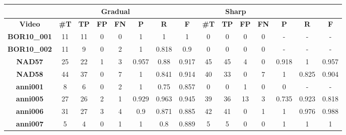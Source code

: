 \documentclass[journal]{IEEEtran}
\begin{document}
\begin{table*}[h]
\centering

\begin{tabular}{|c|c|c|c|c|c|c|c|c|c|c|c|c|c|c|}
\hline
 & \multicolumn{6}{c|}{\textbf{Gradual}} & \multicolumn{6}{c|}{\textbf{Sharp}}  \\ \hline
\textbf{Video}  & \textbf{\#T} & \textbf{TP} & \textbf{FP} & \textbf{FN} & \textbf{P} & \textbf{R} & \textbf{F} & \textbf{\#T} & \textbf{TP} & \textbf{FP} & \textbf{FN} & \textbf{P} & \textbf{R} & \textbf{F} \\ \hline
\textbf{BOR10\_001} & 11            & 11          & 0           & 0           & 1          & 1          & 1          & 0             & 0           & 0           & 0           & -          & -          & -          \\ \hline
\textbf{BOR10\_002} & 11            & 9           & 0           & 2           & 1          & 0.818      & 0.9        & 0             & 0           & 0           & 0           & -          & -          & -          \\ \hline
\textbf{NAD57}      & 25            & 22          & 1           & 3           & 0.957      & 0.88       & 0.917      & 45            & 45          & 4           & 0           & 0.918      & 1          & 0.957      \\ \hline
\textbf{NAD58}      & 44            & 37          & 0           & 7           & 1          & 0.841      & 0.914      & 40            & 33          & 0           & 7           & 1          & 0.825      & 0.904      \\ \hline
\textbf{anni001}    & 8             & 6           & 0           & 2           & 1          & 0.75       & 0.857      & 0             & 0           & 1           & 0           & 0          & -          & -          \\ \hline
\textbf{anni005}    & 27            & 26          & 2           & 1           & 0.929      & 0.963      & 0.945      & 39            & 36          & 13          & 3           & 0.735      & 0.923      & 0.818      \\ \hline
\textbf{anni006}    & 31            & 27          & 3           & 4           & 0.9        & 0.871      & 0.885      & 42            & 41          & 0           & 1           & 1          & 0.976      & 0.988      \\ \hline
\textbf{anni007}    & 5             & 4           & 0           & 1           & 1          & 0.8        & 0.889      & 5             & 5           & 0           & 0           & 1          & 1          & 1          \\ \hline

\end{tabular}
\end{table*}
\end{document}
